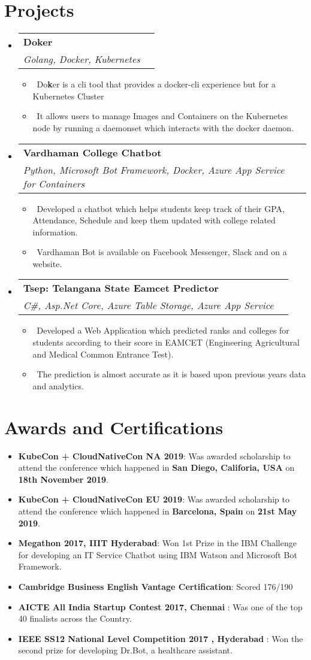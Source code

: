 \documentclass[letterpaper,11pt]{article}
\makeatletter
\newcommand{\resumeItem}[2]{
  \item\small{
    \textbf{#1}{: #2 \vspace{-2pt}}
  }
}
\newcommand{\resumeMyItem}[1]{
  \item\small{
    \ #1 \vspace{-2pt}
  }
}
\newcommand{\resumeSubheading}[4]{
  \vspace{-1pt}\item
    \begin{tabular*}{0.97\textwidth}{l@{\extracolsep{\fill}}r}
      \textbf{#1} & #2 \\
      \textit{\small#3} & \textit{\small #4} \\
    \end{tabular*}\vspace{-5pt}
}
\newcommand{\resumeSubItem}[2]{\resumeItem{#1}{#2}\vspace{-4pt}}
\newcommand{\resumeSubHeadingListStart}{\begin{itemize}[leftmargin=*]}
\newcommand{\resumeSubHeadingListEnd}{\end{itemize}}
\newcommand{\resumeItemListStart}{\begin{itemize}}
\newcommand{\resumeItemListEnd}{\end{itemize}\vspace{-5pt}}
\makeatother
\begin{document}
\section{Projects}
  \resumeSubHeadingListStart

  \resumeSubheading
  {Doker}{}
  {Golang, Docker, Kubernetes}{}
  \resumeItemListStart
    \resumeMyItem{Do\textbf{k}er is a cli tool that provides a docker-cli experience but for a Kubernetes Cluster}
    \resumeMyItem{It allows users to manage Images and Containers on the Kubernetes node by running a daemonset which interacts with the docker daemon.}
  \resumeItemListEnd

  \resumeSubheading
  {Vardhaman College Chatbot}{}
  {Python, Microsoft Bot Framework, Docker, Azure App Service for Containers}{}
  \resumeItemListStart
    \resumeMyItem{Developed a chatbot which helps students keep track of their GPA, Attendance, Schedule and keep them updated with college related information.}
    \resumeMyItem{Vardhaman Bot is available on Facebook Messenger, Slack and on a website.}
  \resumeItemListEnd

    \resumeSubheading
      {Tsep: Telangana State Eamcet Predictor}{}
      {C\#, Asp.Net Core, Azure Table Storage, Azure App Service}{}
      \resumeItemListStart
        \resumeMyItem{Developed a Web Application which predicted ranks and colleges for students according to their score in EAMCET (Engineering Agricultural and Medical Common Entrance Test).}
        \resumeMyItem{The prediction is almost accurate as it is based upon previous years data and analytics.}
      \resumeItemListEnd
    \resumeSubHeadingListEnd
\section{Awards and Certifications}
  \resumeSubHeadingListStart
  \resumeSubItem{KubeCon + CloudNativeCon NA 2019}{Was awarded scholarship to attend the conference which happened in \textbf{San Diego, Califoria, USA} on \textbf{18th November 2019}.}
    \resumeSubItem{KubeCon + CloudNativeCon EU 2019}{Was awarded scholarship to attend the conference which happened in \textbf{Barcelona, Spain} on \textbf{21st May 2019}.}
    \resumeSubItem{Megathon 2017, IIIT Hyderabad}
      {Won 1st Prize in the IBM Challenge for developing an IT Service Chatbot using IBM Watson and Microsoft Bot Framework.}
      \resumeSubItem{Cambridge Business English Vantage Certification}
      {Scored  176/190 }
      \resumeSubItem{AICTE All India Startup Contest 2017, Chennai }
      {Was one of the top 40 finalists across the Country.}
      \resumeSubItem{IEEE SS12 National Level Competition 2017 , Hyderabad }
      {Won the second prize for developing Dr.Bot, a healthcare assistant.}
  \resumeSubHeadingListEnd
\end{document}
